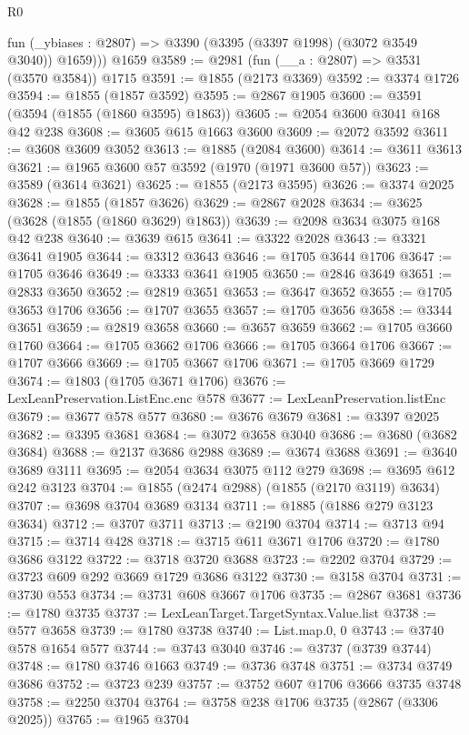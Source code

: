 \begin{lexlean}{R0}
\begin{coremodule}
      fun (_ybiases : @2807) => @3390 (@3395 (@3397 @1998) (@3072 @3549 @3040)) @1659)))
    @1659
@3589 := @2981 (fun (__a : @2807) => @3531 (@3570 @3584)) @1715
@3591 := @1855 (@2173 @3369)
@3592 := @3374 @1726
@3594 := @1855 (@1857 @3592)
@3595 := @2867 @1905
@3600 := @3591 (@3594 (@1855 (@1860 @3595) @1863))
@3605 := @2054 @3600 @3041 @168 @42 @238
@3608 := @3605 @615 @1663 @3600
@3609 := @2072 @3592
@3611 := @3608 @3609 @3052
@3613 := @1885 (@2084 @3600)
@3614 := @3611 @3613
@3621 := @1965 @3600 @57 @3592 (@1970 (@1971 @3600 @57))
@3623 := @3589 (@3614 @3621)
@3625 := @1855 (@2173 @3595)
@3626 := @3374 @2025
@3628 := @1855 (@1857 @3626)
@3629 := @2867 @2028
@3634 := @3625 (@3628 (@1855 (@1860 @3629) @1863))
@3639 := @2098 @3634 @3075 @168 @42 @238
@3640 := @3639 @615
@3641 := @3322 @2028
@3643 := @3321 @3641 @1905
@3644 := @3312 @3643
@3646 := @1705 @3644 @1706
@3647 := @1705 @3646
@3649 := @3333 @3641 @1905
@3650 := @2846 @3649
@3651 := @2833 @3650
@3652 := @2819 @3651
@3653 := @3647 @3652
@3655 := @1705 @3653 @1706
@3656 := @1707 @3655
@3657 := @1705 @3656
@3658 := @3344 @3651
@3659 := @2819 @3658
@3660 := @3657 @3659
@3662 := @1705 @3660 @1760
@3664 := @1705 @3662 @1706
@3666 := @1705 @3664 @1706
@3667 := @1707 @3666
@3669 := @1705 @3667 @1706
@3671 := @1705 @3669 @1729
@3674 := @1803 (@1705 @3671 @1706)
@3676 := LexLeanPreservation.ListEnc.enc @578
@3677 := LexLeanPreservation.listEnc
@3679 := @3677 @578 @577
@3680 := @3676 @3679
@3681 := @3397 @2025
@3682 := @3395 @3681
@3684 := @3072 @3658 @3040
@3686 := @3680 (@3682 @3684)
@3688 := @2137 @3686 @2988
@3689 := @3674 @3688
@3691 := @3640 @3689 @3111
@3695 := @2054 @3634 @3075 @112 @279
@3698 := @3695 @612 @242 @3123
@3704 := @1855 (@2474 @2988) (@1855 (@2170 @3119) @3634)
@3707 := @3698 @3704 @3689 @3134
@3711 := @1885 (@1886 @279 @3123 @3634)
@3712 := @3707 @3711
@3713 := @2190 @3704
@3714 := @3713 @94
@3715 := @3714 @428
@3718 := @3715 @611 @3671 @1706
@3720 := @1780 @3686 @3122
@3722 := @3718 @3720 @3688
@3723 := @2202 @3704
@3729 := @3723 @609 @292 @3669 @1729 @3686 @3122
@3730 := @3158 @3704
@3731 := @3730 @553
@3734 := @3731 @608 @3667 @1706
@3735 := @2867 @3681
@3736 := @1780 @3735
@3737 := LexLeanTarget.TargetSyntax.Value.list
@3738 := @577 @3658
@3739 := @1780 @3738
@3740 := List.map.{0, 0}
@3743 := @3740 @578 @1654 @577
@3744 := @3743 @3040
@3746 := @3737 (@3739 @3744)
@3748 := @1780 @3746 @1663
@3749 := @3736 @3748
@3751 := @3734 @3749 @3686
@3752 := @3723 @239
@3757 := @3752 @607 @1706 @3666 @3735 @3748
@3758 := @2250 @3704
@3764 := @3758 @238 @1706 @3735 (@2867 (@3306 @2025))
@3765 := @1965 @3704

\end{coremodule}
\end{lexlean}

